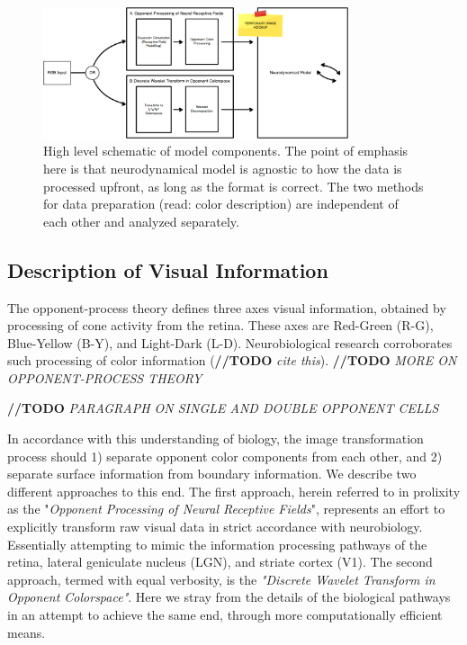 \documentclass[journal,onecolumn]{IEEEtran}
\begin{document}
\begin{figure}[H]
    \centering
    \includegraphics[width=0.8\textwidth]{model1_mockup}
    \caption{High level schematic of model components. The point of emphasis here is that neurodynamical model is agnostic to how the data is processed upfront, as long as the format is correct. The two methods for data preparation (read: color description) are independent of each other and analyzed separately.}
    \label{fig:model-parts}
\end{figure}

\subsection*{Description of Visual Information}

The opponent-process theory defines three axes visual information, obtained by processing of cone activity from the retina. These axes are Red-Green (R-G), Blue-Yellow (B-Y), and Light-Dark (L-D). Neurobiological research corroborates such processing of color information (\textbf{//TODO} \textit{cite this}). \textbf{//TODO} \textit{MORE ON OPPONENT-PROCESS THEORY}

\textbf{//TODO} \textit{PARAGRAPH ON SINGLE AND DOUBLE OPPONENT CELLS}

In accordance with this understanding of biology, the image transformation process should 1) separate opponent color components from each other, and 2) separate surface information from boundary information. We describe two different approaches to this end. The first approach, herein referred to in prolixity as the "\textit{Opponent Processing of Neural Receptive Fields}", represents an effort to explicitly transform raw visual data in strict accordance with neurobiology. Essentially attempting to mimic the information processing pathways of the retina, lateral geniculate nucleus (LGN), and striate cortex (V1). The second approach, termed with equal verbosity, is the \textit{"Discrete Wavelet Transform in Opponent Colorspace"}. Here we stray from the details of the biological pathways in an attempt to achieve the same end, through more computationally efficient means.
\end{document}
